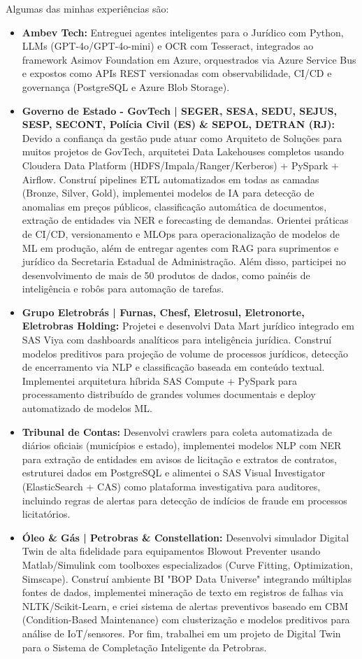 \begin{cvparagraph}
Algumas das minhas experiências são:
\begin{itemize}
  \item \textbf{Ambev Tech:} Entreguei agentes inteligentes para o Jurídico com Python, LLMs (GPT-4o/GPT-4o-mini) e OCR com Tesseract, integrados ao framework Asimov Foundation em Azure, orquestrados via Azure Service Bus e expostos como APIs REST versionadas com observabilidade, CI/CD e governança (PostgreSQL e Azure Blob Storage).
  \item \textbf{Governo de Estado - GovTech | SEGER, SESA, SEDU, SEJUS, SESP, SECONT, Polícia Civil (ES) \& SEPOL, DETRAN (RJ):} Devido a confiança da gestão pude atuar como Arquiteto de Soluções para muitos projetos de GovTech, arquitetei Data Lakehouses completos usando Cloudera Data Platform (HDFS/Impala/Ranger/Kerberos) + PySpark + Airflow. Construí pipelines ETL automatizados em todas as camadas (Bronze, Silver, Gold), implementei modelos de IA para detecção de anomalias em preços públicos, classificação automática de documentos, extração de entidades via NER e forecasting de demandas. Orientei práticas de CI/CD, versionamento e MLOps para operacionalização de modelos de ML em produção, além de entregar agentes com RAG para suprimentos e jurídico da Secretaria Estadual de Administração. Além disso, participei no desenvolvimento de mais de 50 produtos de dados, como painéis de inteligência e robôs para automação de tarefas.
  \item \textbf{Grupo Eletrobrás | Furnas, Chesf, Eletrosul, Eletronorte, Eletrobras Holding:} Projetei e desenvolvi Data Mart jurídico integrado em SAS Viya com dashboards analíticos para inteligência jurídica. Construí modelos preditivos para projeção de volume de processos jurídicos, detecção de encerramento via NLP e classificação baseada em conteúdo textual. Implementei arquitetura híbrida SAS Compute + PySpark para processamento distribuído de grandes volumes documentais e deploy automatizado de modelos ML.
  \item \textbf{Tribunal de Contas:} Desenvolvi crawlers para coleta automatizada de diários oficiais (municípios e estado), implementei modelos NLP com NER para extração de entidades em avisos de licitação e extratos de contratos, estruturei dados em PostgreSQL e alimentei o SAS Visual Investigator (ElasticSearch + CAS) como plataforma investigativa para auditores, incluindo regras de alertas para detecção de indícios de fraude em processos licitatórios.
  \item \textbf{Óleo \& Gás | Petrobras \& Constellation:} Desenvolvi simulador Digital Twin de alta fidelidade para equipamentos Blowout Preventer usando Matlab/Simulink com toolboxes especializados (Curve Fitting, Optimization, Simscape). Construí ambiente BI "BOP Data Universe" integrando múltiplas fontes de dados, implementei mineração de texto em registros de falhas via NLTK/Scikit-Learn, e criei sistema de alertas preventivos baseado em CBM (Condition-Based Maintenance) com clusterização e modelos preditivos para análise de IoT/sensores. Por fim, trabalhei em um projeto de Digital Twin para o Sistema de Completação Inteligente da Petrobras.
\end{itemize}


\end{cvparagraph}
